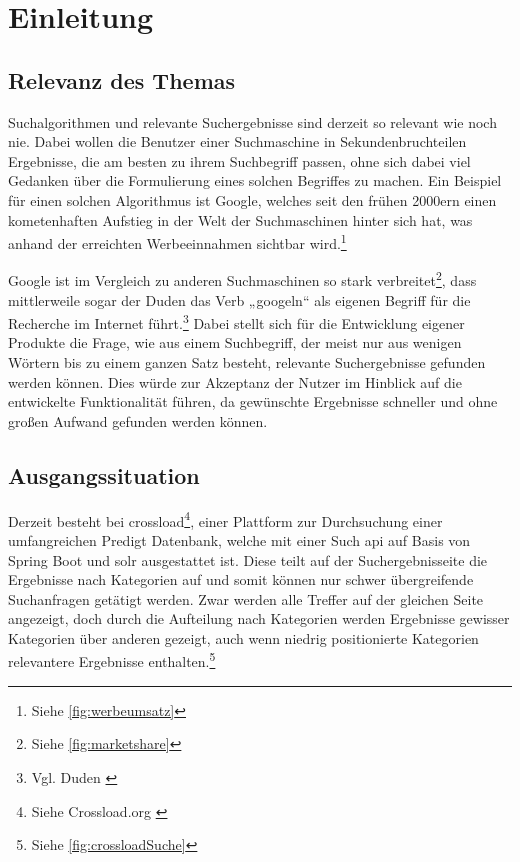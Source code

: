 \chapter{Einleitung}\label{ch:intro}

\section{Relevanz des Themas}
Suchalgorithmen und relevante Suchergebnisse sind derzeit so relevant wie noch nie.
Dabei wollen die Benutzer einer Suchmaschine in Sekundenbruchteilen Ergebnisse, die am besten zu ihrem Suchbegriff passen, ohne sich dabei viel Gedanken über die Formulierung eines solchen Begriffes zu machen.
Ein Beispiel für einen solchen Algorithmus ist Google, welches seit den frühen 2000ern einen kometenhaften Aufstieg in der Welt der Suchmaschinen hinter sich hat, was anhand der erreichten Werbeeinnahmen sichtbar wird.\footnote{Siehe \ref{fig:werbeumsatz}}

Google ist im Vergleich zu anderen Suchmaschinen so stark verbreitet\footnote{Siehe \ref{fig:marketshare}}, dass mittlerweile sogar der Duden das Verb „googeln“ als eigenen Begriff für die Recherche im Internet führt.\footnote{Vgl. Duden \cite{duden2022}}
Dabei stellt sich für die Entwicklung eigener Produkte die Frage, wie aus einem Suchbegriff, der meist nur aus wenigen Wörtern bis zu einem ganzen Satz besteht, relevante Suchergebnisse gefunden werden können. Dies würde zur Akzeptanz der Nutzer im Hinblick auf die entwickelte Funktionalität führen, da gewünschte Ergebnisse schneller und ohne großen Aufwand gefunden werden können.

\section{Ausgangssituation}
Derzeit besteht bei \gls{crossload}\footnote{Siehe Crossload.org \cite{pfleiderer2022}}, einer Plattform zur Durchsuchung einer umfangreichen Predigt Datenbank, welche mit einer Such \gls{api} auf Basis von Spring Boot und \gls{solr} ausgestattet ist. Diese teilt auf der Suchergebnisseite die Ergebnisse nach Kategorien auf und somit können nur schwer übergreifende Suchanfragen getätigt werden. Zwar werden alle Treffer auf der gleichen Seite angezeigt, doch durch die Aufteilung nach Kategorien werden Ergebnisse gewisser Kategorien über anderen gezeigt, auch wenn niedrig positionierte Kategorien relevantere Ergebnisse enthalten.\footnote{Siehe \ref{fig:crossloadSuche}}

